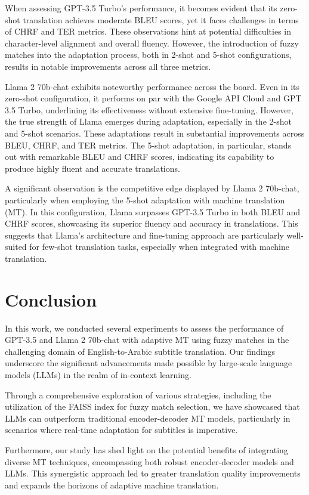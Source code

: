 \documentclass[twocolumn]{article}
\begin{document}
When assessing GPT-3.5 Turbo's performance, it becomes evident that its zero-shot translation achieves moderate BLEU scores, yet it faces challenges in terms of CHRF and TER metrics. These observations hint at potential difficulties in character-level alignment and overall fluency. However, the introduction of fuzzy matches into the adaptation process, both in 2-shot and 5-shot configurations, results in notable improvements across all three metrics. 

Llama 2 70b-chat exhibits noteworthy performance across the board. Even in its zero-shot configuration, it performs on par with the Google API Cloud and GPT 3.5 Turbo, underlining its effectiveness without extensive fine-tuning. However, the true strength of Llama emerges during adaptation, especially in the 2-shot and 5-shot scenarios. These adaptations result in substantial improvements across BLEU, CHRF, and TER metrics. The 5-shot adaptation, in particular, stands out with remarkable BLEU and CHRF scores, indicating its capability to produce highly fluent and accurate translations.

A significant observation is the competitive edge displayed by Llama 2 70b-chat, particularly when employing the 5-shot adaptation with machine translation (MT). In this configuration, Llama surpasses GPT-3.5 Turbo in both BLEU and CHRF scores, showcasing its superior fluency and accuracy in translations. This suggests that Llama's architecture and fine-tuning approach are particularly well-suited for few-shot translation tasks, especially when integrated with machine translation.

\section{Conclusion}
In this work, we conducted several experiments to assess the performance of GPT-3.5 and Llama 2 70b-chat with adaptive MT using fuzzy matches in the challenging domain of English-to-Arabic subtitle translation. Our findings underscore the significant advancements made possible by large-scale language models (LLMs) in the realm of in-context learning.

Through a comprehensive exploration of various strategies, including the utilization of the FAISS index for fuzzy match selection, we have showcased that LLMs can outperform traditional encoder-decoder MT models, particularly in scenarios where real-time adaptation for subtitles is imperative.

Furthermore, our study has shed light on the potential benefits of integrating diverse MT techniques, encompassing both robust encoder-decoder models and LLMs. This synergistic approach led to greater translation quality improvements and expands the horizons of adaptive machine translation.
\end{document}
